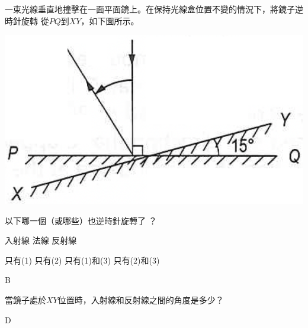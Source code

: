 {
    一束光線垂直地撞擊在一面平面鏡上。在保持光線盒位置不變的情況下，將鏡子逆時針旋轉  從$PQ$到$XY$，如下圖所示。
    \bigskip \par{\par\centering\includegraphics[width=.35\textwidth]{./img/ch1prob_2024-05-18-16-20-23.png}\par} \bigskip

}{}

{
    以下哪一個（或哪些）也逆時針旋轉了 ？
    \begin{statements}
        \task 入射線
        \task 法線
        \task 反射線
    \end{statements}
    \begin{tasks}
        \task 只有(1)
        \task 只有(2)
        \task 只有(1)和(3)
        \task 只有(2)和(3)
    \end{tasks}
}{\mckey B}

{
    當鏡子處於$XY$位置時，入射線和反射線之間的角度是多少？
    \begin{tasks}
        \task {}
        \task {}
        \task {}
        \task {}
    \end{tasks}


}{\mckey D}